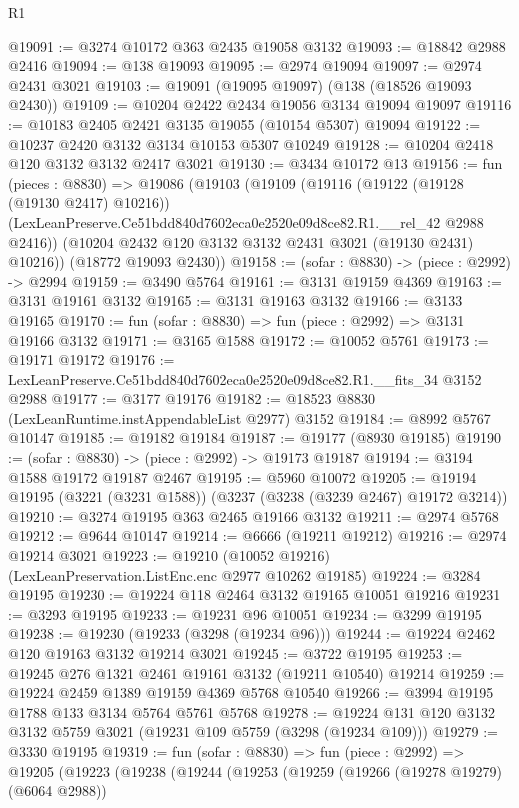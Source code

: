 \begin{lexlean}{R1}
\begin{coremodule}
@19091 := @3274 @10172 @363 @2435 @19058 @3132
@19093 := @18842 @2988 @2416
@19094 := @138 @19093
@19095 := @2974 @19094
@19097 := @2974 @2431 @3021
@19103 := @19091 (@19095 @19097) (@138 (@18526 @19093 @2430))
@19109 := @10204 @2422 @2434 @19056 @3134 @19094 @19097
@19116 := @10183 @2405 @2421 @3135 @19055 (@10154 @5307) @19094
@19122 := @10237 @2420 @3132 @3134 @10153 @5307 @10249
@19128 := @10204 @2418 @120 @3132 @3132 @2417 @3021
@19130 := @3434 @10172 @13
@19156 := fun (pieces : @8830) =>
  @19086
    (@19103
      (@19109
        (@19116
          (@19122 (@19128 (@19130 @2417) @10216))
          (LexLeanPreserve.Ce51bdd840d7602eca0e2520e09d8ce82.R1.__rel_42 @2988 @2416))
        (@10204 @2432 @120 @3132 @3132 @2431 @3021 (@19130 @2431) @10216))
      (@18772 @19093 @2430))
@19158 := (sofar : @8830) -> (piece : @2992) -> @2994
@19159 := @3490 @5764
@19161 := @3131 @19159 @4369
@19163 := @3131 @19161 @3132
@19165 := @3131 @19163 @3132
@19166 := @3133 @19165
@19170 := fun (sofar : @8830) => fun (piece : @2992) => @3131 @19166 @3132
@19171 := @3165 @1588
@19172 := @10052 @5761
@19173 := @19171 @19172
@19176 := LexLeanPreserve.Ce51bdd840d7602eca0e2520e09d8ce82.R1.__fits_34 @3152 @2988
@19177 := @3177 @19176
@19182 := @18523 @8830 (LexLeanRuntime.instAppendableList @2977) @3152
@19184 := @8992 @5767 @10147
@19185 := @19182 @19184
@19187 := @19177 (@8930 @19185)
@19190 := (sofar : @8830) -> (piece : @2992) -> @19173 @19187
@19194 := @3194 @1588 @19172 @19187 @2467
@19195 := @5960 @10072
@19205 := @19194 @19195 (@3221 (@3231 @1588)) (@3237 (@3238 (@3239 @2467) @19172 @3214))
@19210 := @3274 @19195 @363 @2465 @19166 @3132
@19211 := @2974 @5768
@19212 := @9644 @10147
@19214 := @6666 (@19211 @19212)
@19216 := @2974 @19214 @3021
@19223 := @19210 (@10052 @19216) (LexLeanPreservation.ListEnc.enc @2977 @10262 @19185)
@19224 := @3284 @19195
@19230 := @19224 @118 @2464 @3132 @19165 @10051 @19216
@19231 := @3293 @19195
@19233 := @19231 @96 @10051
@19234 := @3299 @19195
@19238 := @19230 (@19233 (@3298 (@19234 @96)))
@19244 := @19224 @2462 @120 @19163 @3132 @19214 @3021
@19245 := @3722 @19195
@19253 := @19245 @276 @1321 @2461 @19161 @3132 (@19211 @10540) @19214
@19259 := @19224 @2459 @1389 @19159 @4369 @5768 @10540
@19266 := @3994 @19195 @1788 @133 @3134 @5764 @5761 @5768
@19278 := @19224 @131 @120 @3132 @3132 @5759 @3021 (@19231 @109 @5759 (@3298 (@19234 @109)))
@19279 := @3330 @19195
@19319 := fun (sofar : @8830) =>
  fun (piece : @2992) =>
  @19205
    (@19223
      (@19238
        (@19244
          (@19253
            (@19259
              (@19266 (@19278 @19279) (@6064 @2988))

\end{coremodule}
\end{lexlean}
